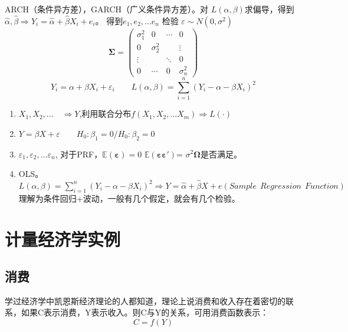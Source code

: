 ARCH（条件异方差），GARCH（广义条件异方差）。对 $ L(\alpha , \beta) $求偏导，得到
$ \widehat{\alpha}, \widehat{\beta} \Longrightarrow Y_{i} =  \widehat{\alpha} + \widehat{\beta} X_{i} + e_{i} $。
得到$ e_{1},e_{2},\ldots e_{n} $ 检验 $ \varepsilon  \sim  N(0,\sigma^2) $
$$  \boldsymbol{\Sigma} = \left(\begin{array}{cccc}
 \sigma_{1}^{2} & 0 & \cdots & 0 \\ 
 0 & \sigma_{2}^{2} & & \vdots \\ 
 \vdots & & \ddots & 0 \\ 0 & \cdots & 0 & \sigma_{n}^{2}
 \end{array} \right) $$
\begin{displaymath}
	Y_{i} = \alpha + \beta X_{i} + \varepsilon_{i}  \qquad
	L(\alpha , \beta) = \sum_{i=1}^n(Y_{i} -\alpha -\beta X_{i} )^2
\end{displaymath}
\begin{enumerate}
	\item$  X_{1},X_{2},\ldots  $\ \ $ \Longrightarrow Y $,利用联合分布$ f(X_{1},X_{2},\ldots X_{m})  \Longrightarrow L(\cdot) $
	\item $ Y = \beta X + \varepsilon \qquad H_0 : \beta_1 =0 / H_0 : \beta_2 =  0 $
	\item $ \varepsilon_1,\varepsilon_2,\ldots \varepsilon_n $,
			对于PRF，$ \mathbb{E}( \boldsymbol{\varepsilon} ) = 0  $
			$ \mathbb{E}( \boldsymbol{\varepsilon \varepsilon{\prime}} )  $= $ \sigma^2 \boldsymbol{\Omega} $是否满足。
	\item OLS。 $ L(\alpha , \beta) = \sum_{i=1}^n(Y_{i} -\alpha -\beta X_{i} )^2 \Longrightarrow Y 
	     =  \widehat{\alpha} + \widehat{\beta} X + e (Sample  \ \  Regression \ \ Function) $理解为条件回归+波动，一般有几个假定，就会有几个检验。
\end{enumerate}


\section{计量经济学实例}
\subsection{消费}

学过经济学中凯恩斯经济理论的人都知道，理论上说消费和收入存在着密切的联系，如果C表示消费，Y表示收入。则C与Y的关系，可用消费函数表示：
\begin{equation}
	C = f(Y)
\end{equation}

